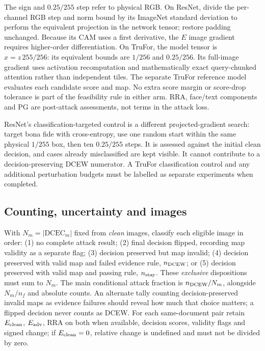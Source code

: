 The sign and $0.25/255$ step refer to physical RGB. On ResNet, divide the per-channel RGB step and norm bound by its ImageNet standard deviation to perform the equivalent projection in the network tensor; restore padding unchanged. Because its CAM uses a first derivative, the $E$ image gradient requires higher-order differentiation. On TruFor, the model tensor is $x=z\,255/256$: its equivalent bounds are $1/256$ and $0.25/256$. Its full-image gradient uses activation recomputation and mathematically exact query-chunked attention rather than independent tiles. The separate TruFor reference model evaluates each candidate score and map. No extra score margin or score-drop tolerance is part of the feasibility rule in either arm. RRA, face/text components and PG are post-attack assessments, not terms in the attack loss.

ResNet's classification-targeted control is a different projected-gradient search: target bona fide with cross-entropy, use one random start within the same physical $1/255$ box, then ten $0.25/255$ steps. It is assessed against the initial clean decision, and cases already misclassified are kept visible. It cannot contribute to a decision-preserving DCEW numerator. A TruFor classification control and any additional perturbation budgets must be labelled as separate experiments when completed.

\subsection{Counting, uncertainty and images}

With $N_m=|\mathrm{DCEC}_m|$ fixed from \emph{clean} images, classify each eligible image in order: (1) no complete attack result; (2) final decision flipped, recording map validity as a separate flag; (3) decision preserved but map invalid; (4) decision preserved with valid map and failed evidence rule, $n_{\rm DCEW}$; or (5) decision preserved with valid map and passing rule, $n_{\rm stay}$. These \emph{exclusive} dispositions must sum to $N_m$. The main conditional attack fraction is $n_{\rm DCEW}/N_m$, alongside $N_m/n_f$ and absolute counts. An alternate tally counting decision-preserved invalid maps as evidence failures should reveal how much that choice matters; a flipped decision never counts as DCEW. For each same-document pair retain $E_{\rm clean}$, $E_{\rm adv}$, RRA on both when available, decision scores, validity flags and signed change; if $E_{\rm clean}=0$, relative change is undefined and must not be divided by zero.


